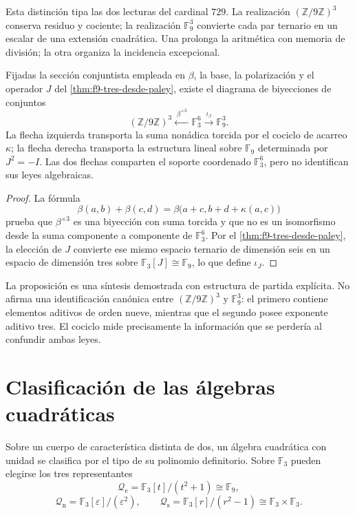 Esta distinción tipa las dos lecturas del cardinal \(729\). La realización
\((\mathbb Z/9\mathbb Z)^3\) conserva residuo y cociente; la realización
\(\mathbb F_9^3\) convierte cada par ternario en un escalar de una extensión
cuadrática. Una prolonga la aritmética con memoria de división; la otra
organiza la incidencia excepcional.

\begin{proposition}
\label{prop:dos-lecturas-tipadas-729}
Fijadas la sección conjuntista empleada en \(\beta\), la base, la
polarización y el operador \(J\) del
\cref{thm:f9-tres-desde-paley}, existe el diagrama de biyecciones de conjuntos
\[
\boxed{
(\mathbb Z/9\mathbb Z)^3
\xleftarrow{\;\beta^{\times3}\;}
\mathbb F_3^6
\xrightarrow{\;\iota_J\;}
\mathbb F_9^3.}
\]
La flecha izquierda transporta la suma nonádica torcida por el cociclo de
acarreo \(\kappa\); la flecha derecha transporta la estructura lineal sobre
\(\mathbb F_9\) determinada por \(J^2=-I\). Las dos flechas comparten el
soporte coordenado \(\mathbb F_3^6\), pero no identifican sus leyes
algebraicas.
\end{proposition}

\begin{proof}
La fórmula
\[
 \beta(a,b)+\beta(c,d)
 =\beta\bigl(a+c,b+d+\kappa(a,c)\bigr)
\]
prueba que \(\beta^{\times3}\) es una biyección con suma torcida y que no es
un isomorfismo desde la suma componente a componente de
\(\mathbb F_3^6\). Por el \cref{thm:f9-tres-desde-paley}, la elección de
\(J\) convierte ese mismo espacio ternario de dimensión seis en un espacio
de dimensión tres sobre
\(\mathbb F_3[J]\cong\mathbb F_9\), lo que define \(\iota_J\).
\end{proof}

La proposición es una síntesis demostrada con estructura de partida
explícita. No afirma una identificación canónica entre
\((\mathbb Z/9\mathbb Z)^3\) y \(\mathbb F_9^3\): el primero contiene
elementos aditivos de orden nueve, mientras que el segundo posee exponente
aditivo tres. El cociclo mide precisamente la información que se perdería al
confundir ambas leyes.

\section{Clasificación de las álgebras cuadráticas}

Sobre un cuerpo de característica distinta de dos, un álgebra cuadrática
con unidad se clasifica por el tipo de su polinomio definitorio. Sobre
\(\mathbb F_3\) pueden elegirse los tres representantes
\[
 \mathcal Q_{\mathrm e}
 =\mathbb F_3[t]/(t^2+1)\cong\mathbb F_9,
\]
\[
 \mathcal Q_{\mathrm n}
 =\mathbb F_3[\varepsilon]/(\varepsilon^2),
 \qquad
 \mathcal Q_{\mathrm s}
 =\mathbb F_3[r]/(r^2-1)
 \cong\mathbb F_3\times\mathbb F_3.
\]


